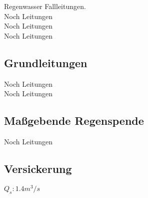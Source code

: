 \documentclass[12pt]{report}
\begin{document}
Regenwasser Fallleitungen.\\
Noch Leitungen\\
Noch Leitungen\\
Noch Leitungen\\

\subsection*{Grundleitungen}

Noch Leitungen\\
Noch Leitungen\\

\subsection*{Maßgebende Regenspende}

Noch Leitungen\\

\subsection*{Versickerung}

$
Q_s: 1.4 m^3/s
$ 




\end{document}
